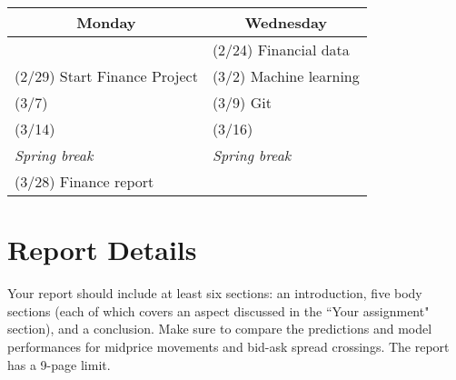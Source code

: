 \documentclass[11pt, oneside]{article}   	%
\begin{document}
\begin{table}[h]
\centering
\begin{tabular}{@{}l|l@{}}
\toprule
\multicolumn{1}{c|}{Monday} & \multicolumn{1}{c}{Wednesday} \\
\hline
                               & (2/24) Financial data \\
(2/29) Start Finance Project   & (3/2) Machine learning \\
(3/7)                          & (3/9) Git \\
(3/14)                         & (3/16) \\
\emph{\hspace{12mm} Spring break}  & \emph{\hspace{12mm} Spring break}\\
(3/28) Finance report          & \\
\bottomrule
\end{tabular}
\end{table}


\section{Report Details}
Your report should include at least six sections: an introduction, five body sections (each of which covers an aspect discussed in the ``Your assignment" section), and a conclusion. Make sure to compare the predictions and model performances for midprice movements and bid-ask spread crossings. The report has a 9-page limit.



\end{document}
